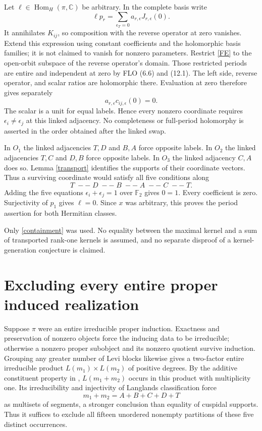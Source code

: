 \documentclass[11pt]{article}
\newcommand{\Hom}{\operatorname{Hom}}
\newcommand{\C}{\mathbb C}
\begin{document}
Let $\ell\in\Hom_H(\pi,\C)$ be arbitrary. In the complete basis write
\[
\ell p_r=\sum_{\epsilon_T=0}a_{r,\epsilon}J_{r,\epsilon}(0).
\]
It annihilates $K_{ij}$, so composition with the reverse operator at zero vanishes. Extend this expression using constant coefficients and the holomorphic basis families; it is not claimed to vanish for nonzero parameters. Restrict \eqref{FE} to the open-orbit subspace of the reverse operator's domain. Those restricted periods are entire and independent at zero by FLO (6.6) and (12.1). The left side, reverse operator, and scalar ratios are holomorphic there. Evaluation at zero therefore gives separately
\[
a_{r,\epsilon}c_{ij,\epsilon}(0)=0.
\]
The scalar is a unit for equal labels. Hence every nonzero coordinate requires $\epsilon_i\ne\epsilon_j$ at this linked adjacency. No completeness or full-period holomorphy is asserted in the order obtained after the linked swap.

In $O_1$ the linked adjacencies $T,D$ and $B,A$ force opposite labels. In $O_2$ the linked adjacencies $T,C$ and $D,B$ force opposite labels. In $O_3$ the linked adjacency $C,A$ does so. Lemma \ref{transport} identifies the supports of their coordinate vectors. Thus a surviving coordinate would satisfy all five conditions along
\[
T\;--\;D\;--\;B\;--\;A\;--\;C\;--\;T.
\]
Adding the five equations $\epsilon_i+\epsilon_j=1$ over $\mathbb F_2$ gives $0=1$. Every coefficient is zero. Surjectivity of $p_1$ gives $\ell=0$. Since $x$ was arbitrary, this proves the period assertion for both Hermitian classes.

Only \eqref{containment} was used. No equality between the maximal kernel and a sum of transported rank-one kernels is assumed, and no separate disproof of a kernel-generation conjecture is claimed.

\section{Excluding every entire proper induced realization}
Suppose $\pi$ were an entire irreducible proper induction. Exactness and preservation of nonzero objects force the inducing data to be irreducible; otherwise a nonzero proper subobject and its nonzero quotient survive induction. Grouping any greater number of Levi blocks likewise gives a two-factor entire irreducible product $L(m_1)\times L(m_2)$ of positive degrees. By the additive constituent property in \cite[Proposition 2.5(5), Theorem 2.6]{LM16}, $L(m_1+m_2)$ occurs in this product with multiplicity one. Its irreducibility and injectivity of Langlands classification force
\[
m_1+m_2=A+B+C+D+T
\]
as multisets of segments, a stronger conclusion than equality of cuspidal supports. Thus it suffices to exclude all fifteen unordered nonempty partitions of these five distinct occurrences.
\end{document}
